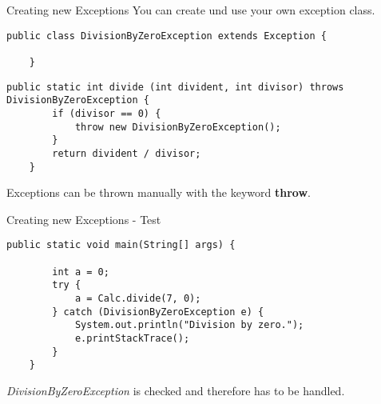 \begin{frame}[fragile]{Creating new Exceptions}
    You can create und use your own exception class.
    \begin{lstlisting}[basicstyle=\ttfamily\scriptsize]
    public class DivisionByZeroException extends Exception {

    }
    \end{lstlisting}
    \vfill
    \begin{lstlisting}[basicstyle=\ttfamily\scriptsize]
    public static int divide (int divident, int divisor) throws DivisionByZeroException {
        if (divisor == 0) {
            throw new DivisionByZeroException();
        }
        return divident / divisor;
    }
    \end{lstlisting}    
    Exceptions can be thrown manually with the keyword \textbf{throw}.
\end{frame}

\begin{frame}[fragile]{Creating new Exceptions - Test}
    \begin{lstlisting}[basicstyle=\ttfamily\scriptsize]
    public static void main(String[] args) {
    
        int a = 0;
        try {
            a = Calc.divide(7, 0);
        } catch (DivisionByZeroException e) {
            System.out.println("Division by zero.");
            e.printStackTrace();
        }
    }
    \end{lstlisting}    
    \emph{DivisionByZeroException} is checked and therefore has to be handled.
\end{frame}

